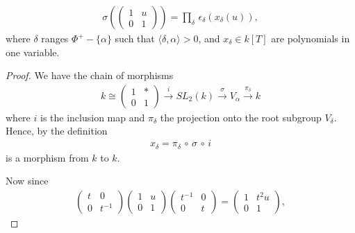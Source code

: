 \begin{lemma} \label{claim1}
\begin{eqnarray*}
\sigma\left(\left(\begin{matrix} 1 & u \\ 0 & 1 \end{matrix}\right)\right) = \prod_\delta\, \epsilon_\delta\left(x_\delta\left(u\right)\right),
\end{eqnarray*}
where $\delta$ ranges $\Phi^+ - \{\alpha\}$ such that $\langle \delta, \alpha \rangle > 0$, and $x_\delta\in k[T]$ are polynomials in one variable.
\end{lemma}
\begin{proof}
We have the chain of morphisms
\begin{eqnarray*}
k\cong \left(\begin{matrix}1 & * \\ 0 & 1\end{matrix}\right) 
\stackrel{i}\longrightarrow SL_2(k) 
\stackrel{\sigma}\longrightarrow V_\alpha 
\stackrel{\pi_\delta}\longrightarrow k
\end{eqnarray*}
where $i$ is the inclusion map and $\pi_\delta$ the projection onto the root subgroup $V_\delta$. Hence, by the definition
\begin{eqnarray*}
x_\delta = \pi_\delta\, \circ\, \sigma\, \circ\, i
\end{eqnarray*}
is a morphism from $k$ to $k$.

Now since
\begin{eqnarray*}
\left(\begin{matrix}
t & 0 \\ 0 & t^{-1}
\end{matrix}\right)
\left(\begin{matrix}
1 & u \\ 0 & 1
\end{matrix}\right)
\left(\begin{matrix}
t^{-1} & 0 \\ 0 & t
\end{matrix}\right)
=
\left(\begin{matrix}
1 & t^2u \\ 0 & 1
\end{matrix}\right),
\end{eqnarray*}


\end{proof}
